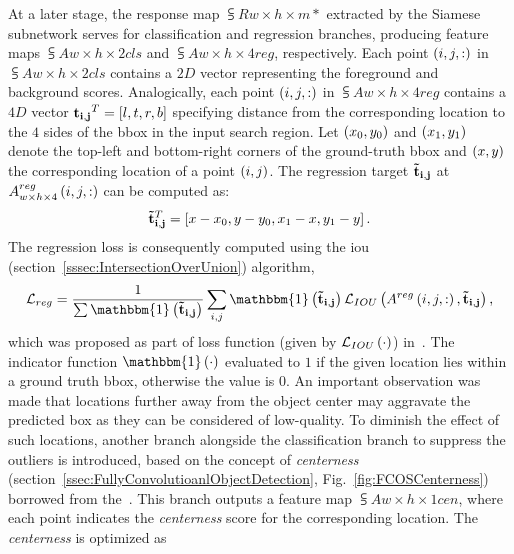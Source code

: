 At a later stage, the response map $\subsup{R}{w \times h \times m}{*}$ extracted by the Siamese subnetwork serves for classification and regression branches, producing feature maps $\subsup{A}{w \times h \times 2}{cls}$ and $\subsup{A}{w \times h \times 4}{reg}$, respectively. Each point $\left( {i, j, :} \right)$ in $\subsup{A}{w \times h \times 2}{cls}$ contains a $2D$ vector representing the foreground and background scores. Analogically, each point $\left( {i, j, :} \right)$ in $\subsup{A}{w \times h \times 4}{reg}$ contains a $4D$ vector ${\mathbf{t_{i, j}}}^T = \left[ {l, t, r, b} \right]$ specifying distance from the corresponding location to the $4$ sides of the \gls{bbox} in the input search region. Let $\left( {x_0, y_0} \right)$ and $\left( {x_1, y_1} \right)$ denote the top-left and bottom-right corners of the ground-truth \gls{bbox} and $\left( {x, y} \right)$ the corresponding location of a point $\left( {i, j} \right)$. The regression target $\mathbf{\tilde{t}_{i, j}}$ at ${A}_{w \times h \times 4}^{reg} \left( {i, j, :} \right)$ can be computed as:
\begin{equation}
    {\mathbf{\tilde{t}_{i, j}}}^T = \left[ {x - x_0, y - y_0, x_1 - x, y_1 - y} \right].
\end{equation}
The regression loss is consequently computed using the \gls{iou} (section~\ref{sssec:IntersectionOverUnion}) algorithm,
\begin{equation}
    \label{eq:SiamCARRegLoss}
    \mathcal{L}_{reg} =
    \frac{1}{\sum \func{\mathbbm{1}}{\vect{\tilde{t}_{i, j}}}}
    \sum_{i, j}
    \func{\mathbbm{1}}{\vect{\tilde{t}_{i, j}}}
    \func{\mathcal{L}_{IOU}}{\func{A^{reg}}{i, j, :}, \vect{\tilde{t}_{i, j}}},
\end{equation}
which was proposed as part of loss function (given by ${\mathcal{L}_{IOU}} \left( \cdot \right)$) in~\cite{yu2016unitbox}. The indicator function $\func{\mathbbm{1}}{\cdot}$ evaluated to $1$ if the given location lies within a ground truth \gls{bbox}, otherwise the value is $0$. An important observation was made that locations further away from the object center may aggravate the predicted box as they can be considered of low-quality. To diminish the effect of such locations, another branch alongside the classification branch to suppress the outliers is introduced, based on the concept of \emph{centerness} (section~\ref{ssec:FullyConvolutioanlObjectDetection}, Fig.~\ref{fig:FCOSCenterness}) borrowed from the~\cite{tian2019fcos}. This branch outputs a feature map $\subsup{A}{w \times h \times 1}{cen}$, where each point indicates the \emph{centerness} score for the corresponding location. The \emph{centerness} is optimized as

